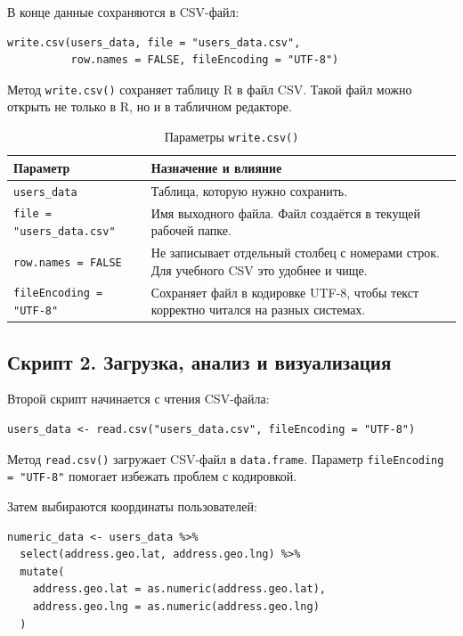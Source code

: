\documentclass[14pt,a4paper]{extarticle}
\begin{document}
В конце данные сохраняются в CSV-файл:

\begin{lstlisting}
write.csv(users_data, file = "users_data.csv",
          row.names = FALSE, fileEncoding = "UTF-8")
\end{lstlisting}

Метод \texttt{write.csv()} сохраняет таблицу R в файл CSV. Такой файл можно открыть не только в R, но и в табличном редакторе.

\begin{table}[H]
\caption{Параметры \texttt{write.csv()}}
\begin{tabularx}{\textwidth}{|l|Y|}
\hline
\textbf{Параметр} & \textbf{Назначение и влияние} \\
\hline
\texttt{users\_data} & Таблица, которую нужно сохранить. \\
\hline
\texttt{file = "users\_data.csv"} & Имя выходного файла. Файл создаётся в текущей рабочей папке. \\
\hline
\texttt{row.names = FALSE} & Не записывает отдельный столбец с номерами строк. Для учебного CSV это удобнее и чище. \\
\hline
\texttt{fileEncoding = "UTF-8"} & Сохраняет файл в кодировке UTF-8, чтобы текст корректно читался на разных системах. \\
\hline
\end{tabularx}
\end{table}

\subsection{Скрипт 2. Загрузка, анализ и визуализация}

Второй скрипт начинается с чтения CSV-файла:

\begin{lstlisting}
users_data <- read.csv("users_data.csv", fileEncoding = "UTF-8")
\end{lstlisting}

Метод \texttt{read.csv()} загружает CSV-файл в \texttt{data.frame}. Параметр \texttt{fileEncoding = "UTF-8"} помогает избежать проблем с кодировкой.

Затем выбираются координаты пользователей:

\begin{lstlisting}
numeric_data <- users_data %>%
  select(address.geo.lat, address.geo.lng) %>%
  mutate(
    address.geo.lat = as.numeric(address.geo.lat),
    address.geo.lng = as.numeric(address.geo.lng)
  )
\end{lstlisting}
\end{document}
